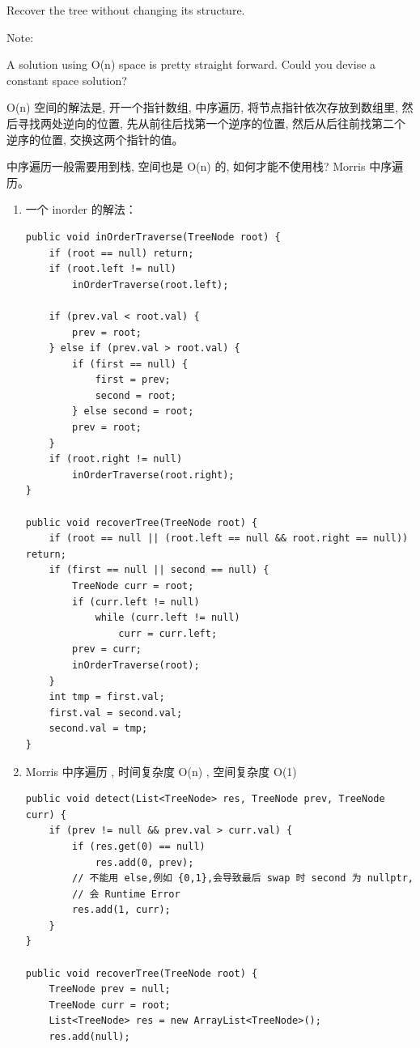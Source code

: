\documentclass[12pt]{book}
\begin{document}
Recover the tree without changing its structure.

Note:

A solution using O(n) space is pretty straight forward. Could you devise a constant space solution?

O(n) 空间的解法是, 开一个指针数组, 中序遍历, 将节点指针依次存放到数组里, 然后寻找两处逆向的位置, 先从前往后找第一个逆序的位置, 然后从后往前找第二个逆序的位置, 交换这两个指针的值。

中序遍历一般需要用到栈, 空间也是 O(n) 的, 如何才能不使用栈? Morris 中序遍历。

\begin{enumerate}
\item 一个 inorder 的解法：
\label{sec-4-2-7-1}

\lstset{language=java,label= ,caption= ,numbers=none}
\begin{lstlisting}
public void inOrderTraverse(TreeNode root) {
    if (root == null) return;
    if (root.left != null)
        inOrderTraverse(root.left);

    if (prev.val < root.val) {
        prev = root;
    } else if (prev.val > root.val) {
        if (first == null) {
            first = prev;
            second = root;
        } else second = root;
        prev = root;
    }
    if (root.right != null)
        inOrderTraverse(root.right);
}

public void recoverTree(TreeNode root) {
    if (root == null || (root.left == null && root.right == null)) return;
    if (first == null || second == null) {
        TreeNode curr = root;
        if (curr.left != null)
            while (curr.left != null) 
                curr = curr.left;
        prev = curr;
        inOrderTraverse(root);
    }
    int tmp = first.val;
    first.val = second.val;
    second.val = tmp;
}
\end{lstlisting}

\item Morris 中序遍历 , 时间复杂度 O(n) , 空间复杂度 O(1)
\label{sec-4-2-7-2}

\lstset{language=java,label= ,caption= ,numbers=none}
\begin{lstlisting}
public void detect(List<TreeNode> res, TreeNode prev, TreeNode curr) {
    if (prev != null && prev.val > curr.val) {
        if (res.get(0) == null)
            res.add(0, prev); 
        // 不能用 else,例如 {0,1},会导致最后 swap 时 second 为 nullptr,
        // 会 Runtime Error
        res.add(1, curr);
    }
}

public void recoverTree(TreeNode root) {
    TreeNode prev = null;
    TreeNode curr = root;
    List<TreeNode> res = new ArrayList<TreeNode>();
    res.add(null);


\end{lstlisting}
\end{enumerate}
\end{document}
